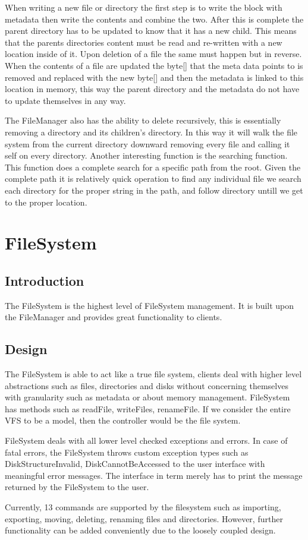 \documentclass[12pt]{article}
\begin{document}
When writing a new file or directory the first step is to write the block with metadata then write the contents and combine the two.  After this is complete the parent directory has to be updated to know that it has a new child. This means that the parents directories content must be read and re-written with a new location inside of it.  Upon deletion of a file the same must happen but in reverse. When the contents of a file are updated the byte[] that the meta data points to is removed and replaced with the new byte[] and then the metadata is linked to this location in memory, this way the parent directory and the metadata do not have to update themselves in any way.

The FileManager also has the ability to delete recursively, this is essentially removing a directory and its children's directory.  In this way it will walk the file system from the current directory downward removing every file and calling it self on every directory.  Another interesting function is the searching function.  This function does a complete search for a specific path from the root.  Given the complete path it is relatively quick operation to find any individual file we search each directory for the proper string in the path, and follow directory untill we get to the proper location.

\section{FileSystem}
\subsection{Introduction}
The FileSystem is the highest level of FileSystem management.  It is built upon the FileManager and provides great functionality to clients. 

\subsection{Design}
The FileSystem is able to act like a true file system, clients deal with higher level abstractions such as files, directories and disks without concerning themselves with granularity such as metadata or about memory management. FileSystem has methods such as readFile, writeFiles, renameFile. If we consider the entire VFS to be a model, then the controller would be the file system.

FileSystem deals with all lower level checked exceptions and errors. In case of fatal errors, the FileSystem throws custom exception types such as DiskStructureInvalid, DiskCannotBeAccessed to the user interface with meaningful error messages. The interface in term merely has to print the message returned by the FileSystem to the user.

Currently, 13 commands are supported by the filesystem such as importing, exporting, moving, deleting, renaming files and directories. However, further functionality can be added conveniently due to the loosely coupled design.
\end{document}
